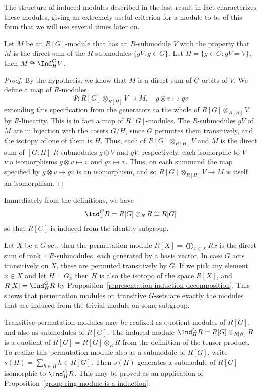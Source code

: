 The structure of induced modules described in the last result in fact characterizes these modules, giving an extremely useful criterion for a module to be of this form that we will use several times later on.
\begin{proposition}\label{group ring module is a induction}
Let $M$ be an $R[G]$-module that has an $R$-submodule $V$ with the property that $M$ is the direct sum of the $R$-submodules $\{gV:g\in G\}$. Let $H=\{g\in G:gV=V\}$, then $M\cong\Ind^G_HV$.
\end{proposition}
\begin{proof}
By the hypothesis, we know that $M$ is a direct sum of $G$-orbits of $V$. We define a map of $R$-modules
\[\Psi:R[G]\otimes_{R[H]}V\to M,\quad g\otimes v\mapsto gv\]
extending this specification from the generators to the whole of $R[G]\otimes_{R[H]}V$ by $R$-linearity. This is in fact a map of $R[G]$-modules. The $R$-submodules $gV$ of $M$ are in bijection with the cosets $G/H$, since $G$ permutes them transitively, and the isotopy of one of them is $H$. Thus, each of $R[G]\otimes_{R[H]}V$ and $M$ is the direct sum of $[G:H]$ $R$-submodules $g\otimes V$ and $gV$, respectively, each isomorphic to $V$ via isomorphisms $g\otimes v\mapsto v$ and $gv\mapsto v$. Thus, on each summand the map specified by $g\otimes v\mapsto gv$ is an isomorphism, and so $R[G]\otimes_{R[H]}V\to M$ is itself an isomorphism.
\end{proof}
\begin{example}
Immediately from the definitions, we have
\[\Ind^G_1R=R[G]\otimes_{R}R\cong R[G]\]
so that $R[G]$ is induced from the identity subgroup.
\end{example}
\begin{example}\label{representation action is induced}
Let $X$ be a $G$-set, then the permutation module $R[X]=\bigoplus_{x\in X}Rx$ is the direct sum of rank $1$ $R$-submodules, each generated by a basis vector. In case $G$ acts transitively on $X$, these are permuted transitively by $G$. If we pick any element $x\in X$ and let $H=G_x$ then $H$ is also the isotopo of the space $R[X]$, and $R[X]=\Ind^G_HR$ by Proposition~\ref{representation induction decomposition}. This shows that permutation modules on transitive $G$-sets are exactly the modules that are induced from the trivial module on some subgroup.\par
Transitive permutation modules may be realized as quotient modules of $R[G]$, and also as submodules of $R[G]$. The induced module $\Ind^G_HR=R[G]\otimes_{R[H]}R$ is a quotient of $R[G]=R[G]\otimes_{R}R$ from the definition of the tensor product. To realize this permutation module also as a submodule of $R[G]$, write $s(H)=\sum_{h\in H}h\in R[G]$. Then $s(H)$ generates a submodule of $R[G]$ isomorphic to $\Ind^G_HR$. This may be proved
as an application of Proposition~\ref{group ring module is a induction}.
\end{example}
